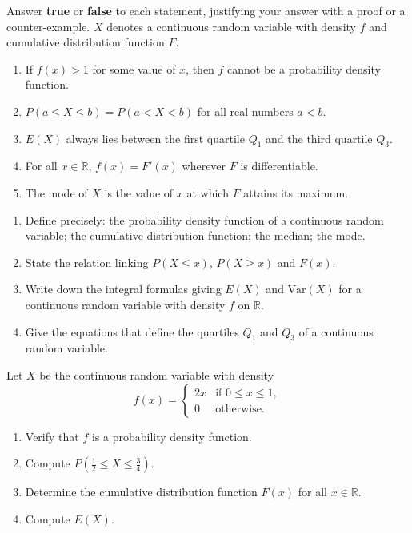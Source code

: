 \documentclass[11pt]{article}
\newcommand{\cle}[1]{{\popxbold\color{popdark}#1}}
\begin{document}
\begin{exercice}
Answer \textbf{true} or \textbf{false} to each statement, justifying your answer with a proof or a counter-example. $X$ denotes a continuous random variable with density $f$ and cumulative distribution function $F$.
\begin{enumerate}
\item If $f(x) > 1$ for some value of $x$, then $f$ cannot be a probability density function.
\item $P(a \leq X \leq b) = P(a < X < b)$ for all real numbers $a < b$.
\item $E(X)$ always lies between the first quartile $Q_1$ and the third quartile $Q_3$.
\item For all $x \in \mathbb{R}$, $f(x) = F'(x)$ wherever $F$ is differentiable.
\item The mode of $X$ is the value of $x$ at which $F$ attains its maximum.
\end{enumerate}
\end{exercice}

\begin{exercice}
\begin{enumerate}
\item Define precisely: the \cle{probability density function} of a continuous random variable; the \cle{cumulative distribution function}; the \cle{median}; the \cle{mode}.
\item State the relation linking $P(X \leq x)$, $P(X \geq x)$ and $F(x)$.
\item Write down the integral formulas giving $E(X)$ and $\mathrm{Var}(X)$ for a continuous random variable with density $f$ on $\mathbb{R}$.
\item Give the equations that define the quartiles $Q_1$ and $Q_3$ of a continuous random variable.
\end{enumerate}
\end{exercice}

\begin{exercice}
Let $X$ be the continuous random variable with density
\[
f(x) = \begin{cases} 2x & \text{if } 0 \leq x \leq 1, \\ 0 & \text{otherwise.} \end{cases}
\]
\begin{enumerate}
\item Verify that $f$ is a probability density function.
\item Compute $P\!\left(\tfrac{1}{2} \leq X \leq \tfrac{3}{4}\right)$.
\item Determine the cumulative distribution function $F(x)$ for all $x \in \mathbb{R}$.
\item Compute $E(X)$.
\end{enumerate}
\end{exercice}
\end{document}
